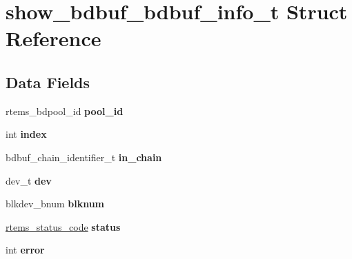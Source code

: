 \hypertarget{structshow__bdbuf__bdbuf__info__t}{}\section{show\+\_\+bdbuf\+\_\+bdbuf\+\_\+info\+\_\+t Struct Reference}
\label{structshow__bdbuf__bdbuf__info__t}
\subsection*{Data Fields}
\begin{DoxyCompactItemize}
\item 
\mbox{\label{structshow__bdbuf__bdbuf__info__t_aa5627e1476de23e9ee38e2223e376bd5}} 
rtems\+\_\+bdpool\+\_\+id {\bfseries pool\+\_\+id}
\item 
\mbox{\label{structshow__bdbuf__bdbuf__info__t_a8c644c9e0d0b5cadbda01baeef63a816}} 
int {\bfseries index}
\item 
\mbox{\label{structshow__bdbuf__bdbuf__info__t_afd8fe3062bbf8346f381a1da6f9d5da2}} 
bdbuf\+\_\+chain\+\_\+identifier\+\_\+t {\bfseries in\+\_\+chain}
\item 
\mbox{\label{structshow__bdbuf__bdbuf__info__t_a6053b948b1eb9a7781ca65af6f33c059}} 
dev\+\_\+t {\bfseries dev}
\item 
\mbox{\label{structshow__bdbuf__bdbuf__info__t_adb0234d02478bd3ad1f986ae57269654}} 
blkdev\+\_\+bnum {\bfseries blknum}
\item 
\mbox{\label{structshow__bdbuf__bdbuf__info__t_a4863053f502aa52a32cdd02e81f26594}} 
\mbox{\hyperlink{group__ClassicStatus_ga545d41846817eaba6143d52ee4d9e9fe}{rtems\+\_\+status\+\_\+code}} {\bfseries status}
\item 
\mbox{\label{structshow__bdbuf__bdbuf__info__t_a67cd214b5f8c2a9f4777c8dde7e75fd7}} 
int {\bfseries error}
\item 
\mbox{\label{structshow__bdbuf__bdbuf__info__t_a40ad59883ab6c78b410a46ede7f2b65c}} 

\end{DoxyCompactItemize}
